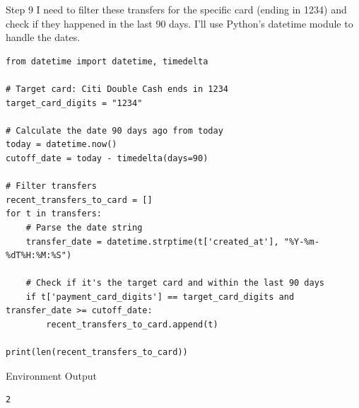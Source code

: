 \begin{center}
\begin{agentbox}{Step 9}
I need to filter these transfers for the specific card (ending in 1234) and check if they happened in the last 90 days. I'll use Python's datetime module to handle the dates.
\begin{Verbatim}[fontsize=\scriptsize, breaklines, breakanywhere]
from datetime import datetime, timedelta

# Target card: Citi Double Cash ends in 1234
target_card_digits = "1234"

# Calculate the date 90 days ago from today
today = datetime.now()
cutoff_date = today - timedelta(days=90)

# Filter transfers
recent_transfers_to_card = []
for t in transfers:
    # Parse the date string
    transfer_date = datetime.strptime(t['created_at'], "%Y-%m-%dT%H:%M:%S")
    
    # Check if it's the target card and within the last 90 days
    if t['payment_card_digits'] == target_card_digits and transfer_date >= cutoff_date:
        recent_transfers_to_card.append(t)

print(len(recent_transfers_to_card))
\end{Verbatim}
\end{agentbox}
\begin{envbox}{Environment Output}
\begin{Verbatim}[fontsize=\scriptsize, breaklines, breakanywhere]
2

\end{Verbatim}
\end{envbox}


\end{center}
